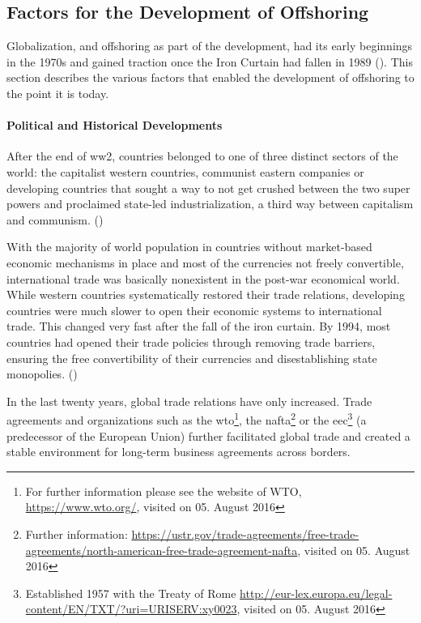 \subsection{Factors for the Development of Offshoring}

Globalization, and offshoring as part of the development, had its early beginnings in the 1970s and gained traction once the Iron Curtain had fallen in 1989 (\cite[p. 1]{Sachs.1995}). This section describes the various factors that enabled the development of offshoring to the point it is today.

\paragraph{Political and Historical Developments}
After the end of \gls{ww2}, countries belonged to one of three distinct sectors of the world: the capitalist western countries, communist eastern companies or developing countries that sought a way to not get crushed between the two super powers and proclaimed state-led industrialization, a third way between capitalism and communism. (\cite[pp. 12f]{Sachs.1995})

With the majority of world population in countries without market-based economic mechanisms in place and most of the currencies not freely convertible, international trade was basically nonexistent in the post-war economical world. While western countries systematically restored their trade relations, developing countries were much slower to open their economic systems to international trade. This changed very fast after the fall of the iron curtain. By 1994, most countries had opened their trade policies through removing trade barriers, ensuring the free convertibility of their currencies and disestablishing state monopolies. (\cite[pp. 12-25]{Sachs.1995})

In the last twenty years, global trade relations have only increased. Trade agreements and organizations such as the \gls{wto}\footnote{For further information please see the website of WTO, \url{https://www.wto.org/}, visited on 05. \nolinebreak August 2016}, the \gls{nafta}\footnote{Further information: \url{https://ustr.gov/trade-agreements/free-trade-agreements/north-american-free-trade-agreement-nafta}, visited on 05. August 2016} or  the \gls{eec}\footnote{Established 1957 with the Treaty of Rome \url{http://eur-lex.europa.eu/legal-content/EN/TXT/?uri=URISERV:xy0023}, visited on 05. August 2016} (a predecessor of the European Union) further facilitated global trade and created a stable environment for long-term business agreements across borders. 

